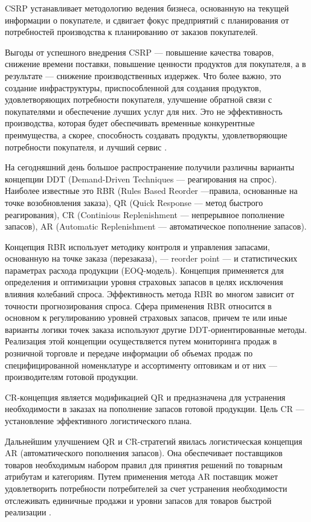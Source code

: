 CSRP устанавливает методологию ведения бизнеса, основанную на текущей информации о покупателе, и сдвигает фокус предприятий с планирования от потребностей производства к планированию от заказов покупателей.

Выгоды от успешного внедрения CSRP --- повышение качества товаров, снижение времени поставки, повышение ценности продуктов для покупателя, а в результате --- снижение производственных издержек.
Что более важно, это создание инфраструктуры, приспособленной для создания продуктов, удовлетворяющих потребности покупателя, улучшение обратной связи с покупателями и обеспечение лучших услуг для них.
Это не эффективность производства, которая будет обеспечивать временные конкурентные преимущества, а скорее, способность создавать продукты, удовлетворяющие потребности покупателя, и лучший сервис \cite[с. 490--491]{grigoryev}.

На сегодняшний день большое распространение получили различны варианты концепции DDT (Demand-Driven Techniques --- реагирования на спрос).
Наиболее известные это RBR (Rules Based Reorder ---правила, основанные на точке возобновления заказа), QR (Quick Response --- метод быстрого реагирования), CR (Continious Replenishment --- непрерывное пополнение запасов), AR (Automatic Replenishment --- автоматическое пополнение запасов).

Концепция RBR использует методику контроля и управления запасами, основанную на точке заказа (перезаказа), --- reorder point --- и статистических параметрах расхода продукции (EOQ-модель).
Концепция применяется для определения и оптимизации уровня страховых запасов в целях исключения влияния колебаний спроса.
Эффективность метода RBR во многом зависит от точности прогнозирования спроса.
Сфера применения RBR относится в основном к регулированию уровней страховых запасов, причем те или иные варианты логики точек заказа используют другие DDT-ориентированные методы.
Реализация этой концепции осуществляется путем мониторинга продаж в розничной торговле и передаче информации об объемах продаж по специфицированной номенклатуре и ассортименту оптовикам и от них --- производителям готовой продукции.

CR-концепция является модификацией QR и предназначена для устранения необходимости в заказах на пополнение запасов готовой продукции.
Цель CR --- установление эффективного логистического плана.

Дальнейшим улучшением QR и CR-стратегий явилась логистическая концепция AR (автоматического пополнения запасов).
Она обеспечивает поставщиков товаров необходимым набором правил для принятия решений по товарным атрибутам и категориям.
Путем применения метода AR поставщик может удовлетворить потребности потребителей за счет устранения необходимости отслеживать единичные продажи и уровни запасов для товаров быстрой реализации \cite[с. 492--493]{grigoryev}.






